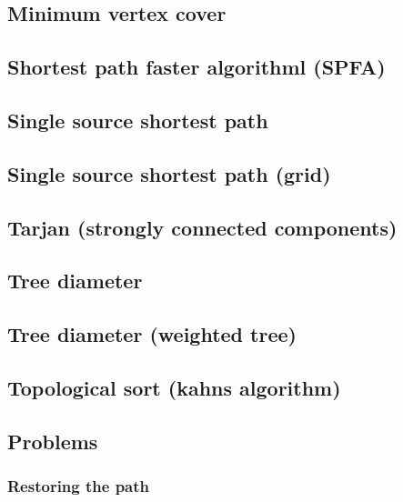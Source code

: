 \subsection{Minimum vertex cover}
\raggedbottom
\hrulefill
\subsection{Shortest path faster algorithml (SPFA)}
\raggedbottom
\hrulefill
\subsection{Single source shortest path}
\raggedbottom
\hrulefill
\subsection{Single source shortest path (grid)}
\raggedbottom
\hrulefill
\subsection{Tarjan (strongly connected components)}
\raggedbottom
\hrulefill
\subsection{Tree diameter}
\raggedbottom
\hrulefill
\subsection{Tree diameter (weighted tree)}
\raggedbottom
\hrulefill
\subsection{Topological sort (kahns algorithm)}
\raggedbottom
\hrulefill
\subsection{Problems}
\subsubsection{Restoring the path}
\raggedbottom
\hrulefill
